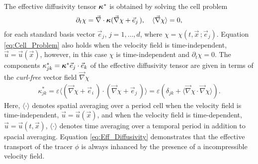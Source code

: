 \documentclass[11pt]{amsart}
\newcommand{\Hb}{\mathbf{H}}
\newcommand{\Ib}{\mathbf{I}}
\newcommand\bkappa{\mbox{\boldmath${\kappa}$}}
\begin{document}
The effective diffusivity tensor $\bkappa^*$ is
obtained by solving the cell problem \cite{Fannjiang:SIAM_JAM:333}
%
\begin{align}\label{eq:Cell_Problem}
  \partial_t\chi=\vec{\nabla}\cdot\bkappa(\vec{\nabla}\chi+\vec{e}_j\,), \quad
  \langle\vec{\nabla}\chi\rangle=0,
\end{align}
%
for each standard basis vector $\vec{e}_j$, $j=1,\ldots,d$, where
$\chi=\chi(t,\vec{x}\,;\vec{e}_j)$. Equation \eqref{eq:Cell_Problem} also holds
\cite{Fannjiang:SIAM_JAM:333} when the velocity field is
time-independent, $\vec{u}=\vec{u}(\vec{x})$, however, in this case $\chi$ 
is time-independent and $\partial_t\chi=0$.  The 
components $\kappa^*_{jk}=\bkappa^*\vec{e}_j\cdot\vec{e}_k$ of the effective
diffusivity tensor are given in terms of the \emph{curl-free} vector
field $\vec{\nabla}\chi$ \cite{Fannjiang:SIAM_JAM:333} 
% 
\begin{align}\label{eq:Eff_Diffusivity}  
   \kappa^*_{jk}=\varepsilon\langle(\vec{\nabla}\chi+\vec{e}_i\,)\cdot(\vec{\nabla}\chi+\vec{e}_j\,)\rangle
       =\varepsilon(\delta_{jk}+\langle\vec{\nabla}\chi\cdot\vec{\nabla}\chi\rangle).
\end{align}
Here, $\langle\cdot\rangle$ denotes spatial averaging over a period cell when the
velocity field is time-independent, $\vec{u}=\vec{u}(\vec{x})$, and
when the velocity field is time-dependent, $\vec{u}=\vec{u}(t,\vec{x})$,
$\langle\cdot\rangle$ denotes time averaging over a temporal period in addition to
spacial averaging. Equation \eqref{eq:Eff_Diffusivity} demonstrates
that the effective transport of the tracer $\phi$ is always inhanced by the
presence of a incompressible velocity field. 
\end{document}

